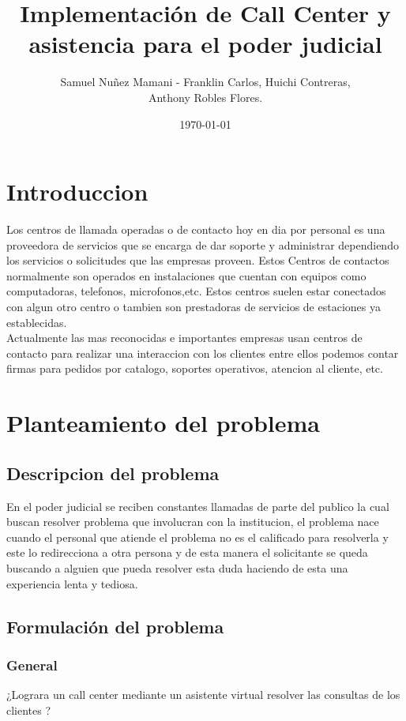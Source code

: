 \documentclass[twoside,twocolumn]{article}
\title{Implementación de Call Center y asistencia para el poder judicial}
\author{Samuel Nuñez Mamani - Franklin Carlos, Huichi Contreras, \\
Anthony Robles Flores. }
\date{\today}
\begin{document}
\maketitle


\section{Introduccion}
Los centros de llamada operadas o de contacto  hoy en dia por personal es una proveedora de servicios que se encarga de dar soporte y administrar dependiendo los servicios o solicitudes que las empresas proveen. Estos Centros de contactos normalmente son operados en instalaciones que cuentan con equipos como computadoras, telefonos, microfonos,etc. Estos centros suelen estar conectados con algun otro centro o tambien son prestadoras de servicios de estaciones ya establecidas.\\
Actualmente las mas reconocidas e importantes empresas usan centros de contacto para realizar una interaccion con los clientes entre ellos podemos 
contar firmas para pedidos por catalogo, soportes operativos, atencion al cliente, etc.

\section{Planteamiento del problema}
\subsection{Descripcion del problema}
En el poder judicial se reciben constantes llamadas de parte del publico la cual buscan resolver problema que involucran con la institucion, el problema nace cuando el personal que atiende
el problema no es el calificado para resolverla y este lo redirecciona a otra persona y de esta manera el solicitante se queda buscando a alguien que pueda resolver esta duda haciendo de
esta una experiencia lenta y tediosa.

\subsection{Formulación del problema}
\subsubsection{General}
¿Lograra un call center mediante un asistente virtual resolver las consultas de los clientes ?
\end{document}
